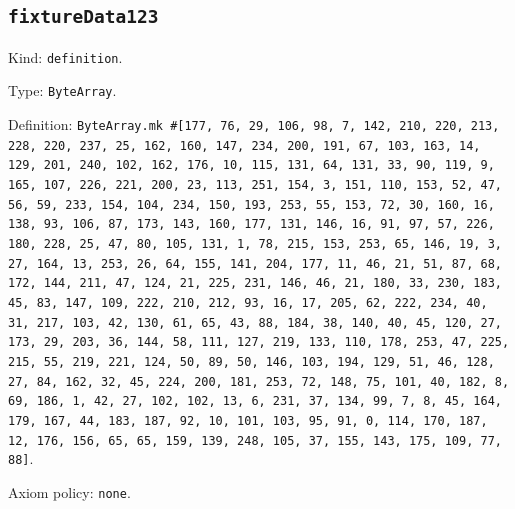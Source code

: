 \documentclass[11pt]{article}
\begin{document}
\subsection*{\texttt{fixtureData123}}
\noindent Kind: \texttt{definition}.\par
\noindent Type: \texttt{ByteArray}.\par
\noindent Definition: \texttt{ByteArray.mk \#[177, 76, 29, 106, 98, 7, 142, 210, 220, 213, 228, 220, 237, 25, 162, 160, 147, 234, 200, 191, 67, 103, 163, 14, 129, 201, 240, 102, 162, 176, 10, 115, 131, 64, 131, 33, 90, 119, 9, 165, 107, 226, 221, 200, 23, 113, 251, 154, 3, 151, 110, 153, 52, 47, 56, 59, 233, 154, 104, 234, 150, 193, 253, 55, 153, 72, 30, 160, 16, 138, 93, 106, 87, 173, 143, 160, 177, 131, 146, 16, 91, 97, 57, 226, 180, 228, 25, 47, 80, 105, 131, 1, 78, 215, 153, 253, 65, 146, 19, 3, 27, 164, 13, 253, 26, 64, 155, 141, 204, 177, 11, 46, 21, 51, 87, 68, 172, 144, 211, 47, 124, 21, 225, 231, 146, 46, 21, 180, 33, 230, 183, 45, 83, 147, 109, 222, 210, 212, 93, 16, 17, 205, 62, 222, 234, 40, 31, 217, 103, 42, 130, 61, 65, 43, 88, 184, 38, 140, 40, 45, 120, 27, 173, 29, 203, 36, 144, 58, 111, 127, 219, 133, 110, 178, 253, 47, 225, 215, 55, 219, 221, 124, 50, 89, 50, 146, 103, 194, 129, 51, 46, 128, 27, 84, 162, 32, 45, 224, 200, 181, 253, 72, 148, 75, 101, 40, 182, 8, 69, 186, 1, 42, 27, 102, 102, 13, 6, 231, 37, 134, 99, 7, 8, 45, 164, 179, 167, 44, 183, 187, 92, 10, 101, 103, 95, 91, 0, 114, 170, 187, 12, 176, 156, 65, 65, 159, 139, 248, 105, 37, 155, 143, 175, 109, 77, 88]}.\par
\noindent Axiom policy: \texttt{none}.\par
\end{document}

